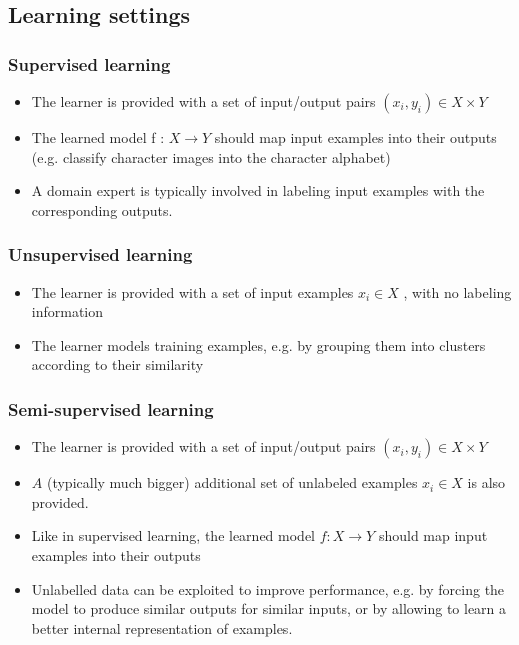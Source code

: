 \documentclass[a4paper, 10pt, titlepage]{article}
\begin{document}
\subsection{Learning settings}
\subsubsection{Supervised learning}
\begin{itemize}
\item The learner is provided with a set of input/output pairs $(x_i , y_i) \in X \times Y$
\item The learned model f : $X \rightarrow Y$ should map input examples into their outputs (e.g. classify character images into
the character alphabet)
\item A domain expert is typically involved in labeling input examples with the corresponding outputs.
\end{itemize}
\subsubsection{Unsupervised learning}
\begin{itemize}
\item The learner is provided with a set of input examples $x_i \in X$ , with no labeling information
\item The learner models training examples, e.g. by grouping them into clusters according to their similarity
\end{itemize}
\subsubsection{Semi-supervised learning}
\begin{itemize}
\item The learner is provided with a set of input/output pairs $(x_i , y_i ) \in X \times Y$
\item $A$ (typically much bigger) additional set of unlabeled examples $x_i \in X$ is also provided.
\item Like in supervised learning, the learned model $f : X \rightarrow Y$ should map input examples into their outputs
\item Unlabelled data can be exploited to improve performance, e.g. by forcing the model to produce similar outputs for similar inputs, or by allowing to learn a better internal representation of examples.
\end{itemize}
\end{document}
